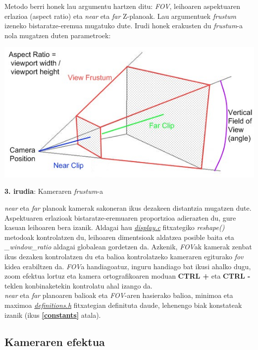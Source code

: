 \documentclass[12pt]{article}
\newcommand{\fitxategi}[1] {\underline{\textit{#1}}}
\newcommand{\metodo}[1] {\textit{#1}}
\newcommand{\aldagai}[1] {\textit{#1}}
\newcommand{\tekla}[1] {\textbf{#1}}
\newcommand{\erref}[1] {\textbf{\ref{#1}}}
\begin{document}
Metodo berri honek lau argumentu hartzen ditu: \textit{FOV}, leihoaren aspektuaren erlazioa (aspect ratio)\cite{aspect_ratio} eta \textit{near} eta \textit{far} Z-planoak. Lau argumentuek \textit{frustum}\cite{frustum} izeneko bistaratze-eremua mugatuko dute. Irudi honek erakusten du \textit{frustum}-a nola mugatzen duten parametroek:

\begin{center}
\includegraphics[scale=0.8]{kamera_frustum.jpg}

\textbf{3. irudia}: Kameraren \textit{frustum}-a
\end{center}

\textit{near} eta \textit{far} planoak kamerak sakoneran ikus dezakeen distantzia mugatzen dute. Aspektuaren erlazioak bistaratze-eremuaren proportzioa adierazten du, gure kasuan leihoaren bera izanik. Aldagai hau \fitxategi{display.c} fitxategiko \metodo{reshape()} metodoak kontrolatzen du, leihoaren dimentsioak aldatzea posible baita eta \aldagai{\_window\_ratio} aldagai globalean gordetzen da. Azkenik, \textit{FOV}ak kamerak zenbat ikus dezaken kontrolatzen du eta balioa kontrolatzeko kameraren egiturako \aldagai{fov} kidea erabiltzen da. \textit{FOV}a handiagoatuz, inguru handiago bat ikusi ahalko dugu, zoom efektua lortuz eta kamera ortografikoaren moduan \tekla{CTRL +} eta \tekla{CTRL -} teklen konbinaketekin kontrolatu ahal izango da.\\

\textit{near} eta \textit{far} planoaren balioak eta \textit{FOV}-aren hasierako balioa, minimoa eta maximoa \fitxategi{definitions.h} fitxategian definituta daude, lehenengo biak konstateak izanik (ikus \erref{constants} atala).


\subsection{Kameraren efektua}\label{kam_sim}
\end{document}
